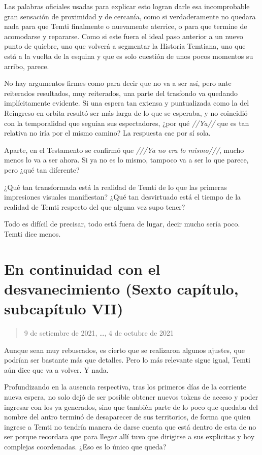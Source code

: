 \documentclass[
  spanish,
]{book}
\begin{document}
Las palabras oficiales usadas para explicar esto logran darle esa incomprobable gran sensación de proximidad y de cercanía, como si verdaderamente no quedara nada para que Temti finalmente o nuevamente aterrice, o para que termine de acomodarse y repararse. Como si este fuera el ideal paso anterior a un nuevo punto de quiebre, uno que volverá a segmentar la Historia Temtiana, uno que está a la vuelta de la esquina y que es solo cuestión de unos pocos momentos su arribo, parece.

No hay argumentos firmes como para decir que no va a ser así, pero ante reiterados resultados, muy reiterados, una parte del trasfondo va quedando implícitamente evidente. Si una espera tan extensa y puntualizada como la del Reingreso en orbita resultó ser más larga de lo que se esperaba, y no coincidió con la temporalidad que seguían sus espectadores, ¿por qué \emph{//Ya//} que es tan relativa no iría por el mismo camino? La respuesta cae por sí sola.

Aparte, en el Testamento se confirmó que \emph{///Ya no era lo mismo///}, mucho menos lo va a ser ahora. Si ya no es lo mismo, tampoco va a ser lo que parece, pero ¿qué tan diferente?

¿Qué tan transformada está la realidad de Temti de lo que las primeras impresiones visuales manifiestan? ¿Qué tan desvirtuado está el tiempo de la realidad de Temti respecto del que alguna vez supo tener?

Todo es difícil de precisar, todo está fuera de lugar, decir mucho sería poco. Temti dice menos.

\hypertarget{en-continuidad-con-el-desvanecimiento-sexto-capuxedtulo-subcapuxedtulo-vii}{%
\section{En continuidad con el desvanecimiento (Sexto capítulo, subcapítulo VII)}\label{en-continuidad-con-el-desvanecimiento-sexto-capuxedtulo-subcapuxedtulo-vii}}

\begin{quote}
9 de setiembre de 2021, \ldots, 4 de octubre de 2021
\end{quote}

Aunque sean muy rebuscados, es cierto que se realizaron algunos ajustes, que podrían ser bastante más que detalles. Pero lo más relevante sigue igual, Temti aún dice que va a volver. Y nada.

Profundizando en la ausencia respectiva, tras los primeros días de la corriente nueva espera, no solo dejó de ser posible obtener nuevos tokens de acceso y poder ingresar con los ya generados, sino que también parte de lo poco que quedaba del nombre del antro terminó de desaparecer de sus territorios, de forma que quien ingrese a Temti no tendría manera de darse cuenta que está dentro de esta de no ser porque recordara que para llegar allí tuvo que dirigirse a sus explicitas y hoy complejas coordenadas. ¿Eso es lo único que queda?
\end{document}
